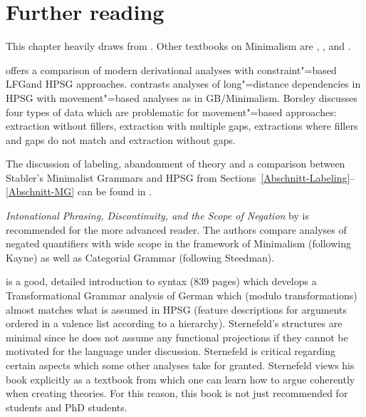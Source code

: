 \section*{Further reading}


This chapter heavily draws from \citet{Adger2003a}. Other textbooks on Minimalism are , , and \citet*{HNG2005a}.

 offers a comparison of modern derivational analyses with constraint"=based LFG\indexlfg and HPSG approaches.
\citet{Borsley2012a} contrasts analyses of long"=distance dependencies in HPSG with movement"=based analyses as in GB/Minimalism. Borsley discusses
four types of data which are problematic for movement"=based approaches: extraction without fillers, extraction with multiple gaps, extractions
where fillers and gaps do not match and extraction without gaps.

The discussion of labeling, abandonment of \xbar theory and a comparison between Stabler's Minimalist Grammars and HPSG from
Sections~\ref{Abschnitt-Labeling}--\ref{Abschnitt-MG} can be found in .

\emph{Intonational Phrasing, Discontinuity, and the Scope of Negation} by \citet{BG2005a} is recommended for the more advanced reader. The authors compare analyses of negated quantifiers with wide
  scope in the framework of Minimalism (following Kayne) as well as Categorial Grammar (following Steedman).


 is a good, detailed introduction to syntax (839 pages) which develops a Transformational Grammar analysis of German which
(modulo transformations) almost matches what is assumed in HPSG (feature descriptions for arguments ordered in a valence list according to a 
hierarchy). Sternefeld's structures are minimal since he does not assume any functional projections if they cannot be motivated for the language
under discussion. Sternefeld is critical regarding certain aspects which some other analyses take for granted. Sternefeld views his book explicitly
as a textbook from which one can learn how to argue coherently when creating theories. For this reason, this book is not just 
recommended for students and PhD students.

